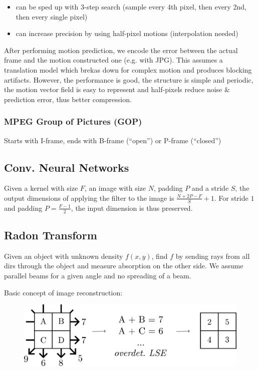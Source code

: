 \documentclass[a4paper,10pt]{article}
\begin{document}
\begin{itemize}
    \item can be sped up with 3-step search (sample every 4th pixel, then every 2nd, then every single pixel)
    \item can increase precision by using half-pixel motions (interpolation needed)
\end{itemize}
After performing motion prediction, we encode the error between the actual frame and the motion constructed one (e.g. with JPG).
This assumes a translation model which brekas down for complex motion and produces blocking artifacts. However, the performance is good, the structure is simple and periodic, the motion vector field is easy to represent and half-pixels reduce noise \& prediction error, thus better compression.
\subsubsection{MPEG Group of Pictures (GOP)} Starts with I-frame, ends with B-frame (``open'') or P-frame (``closed'')

\subsection{Conv. Neural Networks}
Given a kernel with size \( F \), an image with size \( N \), padding \( P \) and a stride \( S \), the output dimensions of applying the filter to the image is \( \frac{N+2P-F}{S} + 1 \). For stride \( 1 \) and padding \( P = \frac{F-1}{2} \), the input dimension is thus preserved.

\subsection{Radon Transform}
Given an object with unknown density \( f(x,y) \), find \( f \) by sending rays from all dirs through the object and measure absorption on the other side. We assume parallel beams for a given angle and no spreading of a beam.

Basic concept of image reconstruction:
\begin{figure}[H]
    \center
    \includegraphics[width=0.75\linewidth]{radon-image-reconstruction.png}
\end{figure}
\end{document}
